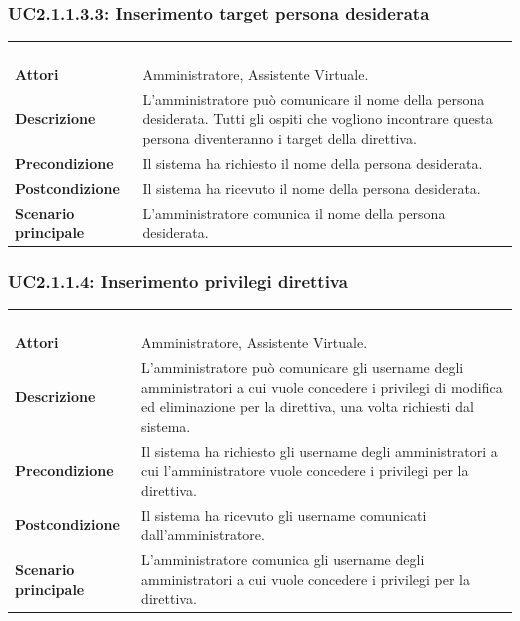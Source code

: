 \subsubsection{UC2.1.1.3.3: Inserimento target persona desiderata}
\label{UC2.1.1.3.3}
\begin{longtable}{l|p{10cm}}
	\rowcolor[gray]{0.8} \multicolumn{2}{c}{} \\
	\rowcolor[gray]{0.8} \multicolumn{2}{c}{\textbf{UC2.1.1.3.3 - Inserimento target persona desiderata}} \\
	\rowcolor[gray]{0.8} \multicolumn{2}{c}{} \\
	\hline
	&\\
	\textbf{Attori} & Amministratore, Assistente Virtuale.\\[7pt]
	\textbf{Descrizione} & L'amministratore può comunicare il nome della persona desiderata. Tutti gli ospiti che vogliono incontrare questa persona diventeranno i target della direttiva.\\[7pt]
	\textbf{Precondizione} & Il sistema ha richiesto il nome della persona desiderata.\\[7pt]
	\textbf{Postcondizione} & Il sistema ha ricevuto il nome della persona desiderata.\\[7pt]
	\textbf{Scenario principale} &L'amministratore comunica il nome della persona desiderata.\\[7pt]\hline
\end{longtable}

\subsubsection{UC2.1.1.4: Inserimento privilegi direttiva}
\label{UC2.1.1.4}
\begin{longtable}{l|p{10cm}}
	\rowcolor[gray]{0.8} \multicolumn{2}{c}{} \\
	\rowcolor[gray]{0.8} \multicolumn{2}{c}{\textbf{UC2.1.1.4 - Inserimento privilegi direttiva}} \\
	\rowcolor[gray]{0.8} \multicolumn{2}{c}{} \\
	\hline
	&\\
	\textbf{Attori} & Amministratore, Assistente Virtuale.\\[7pt]
	\textbf{Descrizione} & L'amministratore può comunicare gli username degli amministratori a cui vuole concedere i privilegi di modifica ed eliminazione per la direttiva, una volta richiesti dal sistema.\\[7pt]
	\textbf{Precondizione} & Il sistema ha richiesto gli username degli amministratori a cui l'amministratore vuole concedere i privilegi per la direttiva.\\[7pt]
	\textbf{Postcondizione} & Il sistema ha ricevuto gli username comunicati dall'amministratore.\\[7pt]
	\textbf{Scenario principale} &L'amministratore comunica gli username degli amministratori a cui vuole concedere i privilegi per la direttiva.\\[7pt]\hline
\end{longtable}

